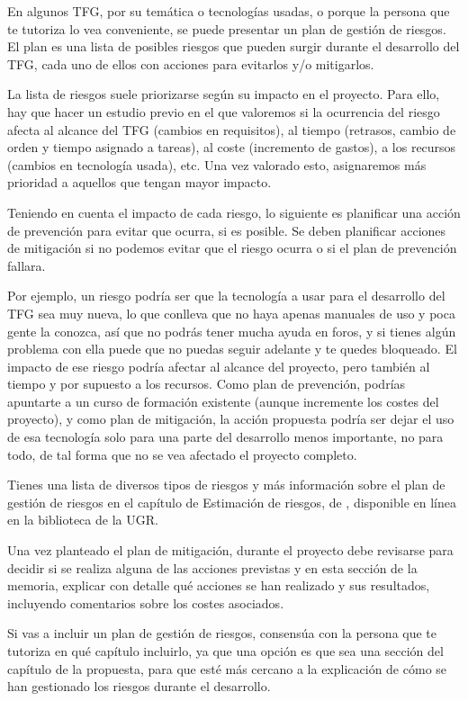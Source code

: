 En algunos TFG, por su temática o tecnologías usadas, o porque la persona que te tutoriza lo vea conveniente, se puede presentar un plan de gestión de riesgos. El plan es una lista de posibles riesgos que pueden surgir durante el desarrollo del TFG, cada uno de ellos con acciones para evitarlos y/o mitigarlos.


La lista de riesgos suele priorizarse según su impacto en el proyecto. Para ello, hay que hacer un estudio previo en el que valoremos si la ocurrencia del riesgo afecta al alcance del TFG (cambios en requisitos), al tiempo (retrasos, cambio de orden y tiempo asignado a tareas), al coste (incremento de gastos), a los recursos (cambios en tecnología usada), etc. Una vez valorado esto, asignaremos más prioridad a aquellos que tengan mayor impacto. 

Teniendo en cuenta el impacto de cada riesgo, lo siguiente es planificar una acción de prevención para evitar que ocurra, si es posible. Se deben planificar acciones de mitigación si no podemos evitar que el riesgo ocurra o si el plan de prevención fallara.

Por ejemplo, un riesgo podría ser que la tecnología a usar para el desarrollo del TFG sea muy nueva, lo que conlleva que no haya apenas manuales de uso y poca gente la conozca, así que no podrás tener mucha ayuda en foros, y  si tienes algún problema con ella puede que no puedas seguir adelante y te quedes bloqueado. El impacto de ese riesgo podría afectar al alcance del proyecto, pero también al tiempo y por supuesto a los recursos. Como plan de prevención, podrías apuntarte a un curso de formación existente (aunque incremente los costes del proyecto), y como plan de mitigación, la acción propuesta podría ser dejar el uso de esa tecnología solo para una parte del desarrollo menos importante, no para todo, de tal forma que no se vea afectado el proyecto completo.

Tienes una lista de diversos tipos de riesgos y más información sobre el plan de gestión de riesgos en el capítulo de Estimación de riesgos, de \cite{guerin2018gestion}, disponible en línea en la biblioteca de la UGR.

Una vez planteado el plan de mitigación, durante el proyecto debe revisarse para decidir si se realiza alguna de las acciones previstas y en esta sección de la memoria, explicar con detalle qué acciones se han realizado y sus resultados, incluyendo comentarios sobre los costes asociados.

Si vas a incluir un plan de gestión de riesgos, consensúa con la persona que te tutoriza en qué capítulo incluirlo, ya que una opción es que sea una sección del capítulo de la propuesta, para que esté más cercano a la explicación de  cómo se han gestionado los riesgos durante el desarrollo.

